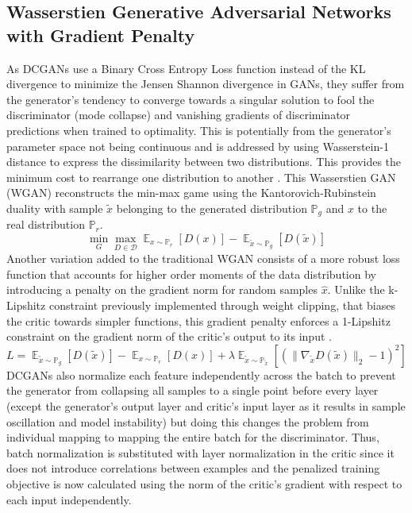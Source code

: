 \documentclass{Configuration_Files/PoliMi3i_thesis}
\begin{document}
\subsection{Wasserstien Generative Adversarial Networks with Gradient Penalty}
\label{wgan-gp}
As DCGANs use a Binary Cross Entropy Loss function instead of the KL divergence 
to minimize the Jensen Shannon divergence in GANs, they suffer from the 
generator’s tendency to converge towards a singular solution to fool the 
discriminator (mode collapse) and vanishing gradients of discriminator predictions 
when trained to optimality. This is potentially from the generator’s parameter space 
not being continuous and is addressed by using Wasserstein-1 distance to express 
the dissimilarity between two distributions. This provides the minimum cost to rearrange 
one distribution to another \cite{MaA17}. This Wasserstien GAN (WGAN) reconstructs the 
min-max game using the Kantorovich-Rubinstein duality with sample $\tilde{x}$ 
belonging to the generated distribution $\mathbb{P}_{g}$ and $x$ to the real distribution $\mathbb{P}_{r}$.
\begin{equation} \label{eq:wganopt}
\min_{G}\max_{D\in\mathcal{D}}\mathop{{}\mathbb{E}}_{x\sim\mathbb{P}_{r}}[D(x)]- \mathop{{}\mathbb{E}}_{\tilde{x}\sim\mathbb{P}_{g}}[D(\tilde{x})]
\end{equation}
Another variation added to the traditional WGAN consists of a more robust loss 
function that accounts for higher order moments of the data distribution by 
introducing a penalty on the gradient norm for random samples $\hat{x}$. Unlike 
the k-Lipshitz constraint previously implemented through weight clipping, that biases the 
critic towards simpler functions, this gradient penalty enforces a 1-Lipshitz 
constraint on the gradient norm of the critic’s output to its input \cite{IsG17}.
\begin{equation} \label{eq:wganloss}
L = \mathop{{}\mathbb{E}}_{\tilde{x}\sim\mathbb{P}_{g}}[D(\tilde{x})] - \mathop{{}\mathbb{E}}_{x\sim\mathbb{P}_{r}}[D(x)] + \lambda\mathop{{}\mathbb{E}}_{\tilde{x}\sim\mathbb{P}_{\tilde{x}}}[(\|\nabla_{\tilde{x}}D(\tilde{x})\|_{2}-1)^2]
\end{equation}
DCGANs also normalize each feature independently across the batch to 
prevent the generator from collapsing all samples to a single point before every layer 
(except the generator’s output layer and critic’s input layer as it results in sample 
oscillation and model instability) but doing this changes the problem from individual 
mapping to mapping the entire batch for the discriminator. Thus, batch 
normalization is substituted with layer normalization in the critic since it does not 
introduce correlations between examples and the penalized training objective is now 
calculated using the norm of the critic’s gradient with respect to each input 
independently. 
\newpage
\end{document}
